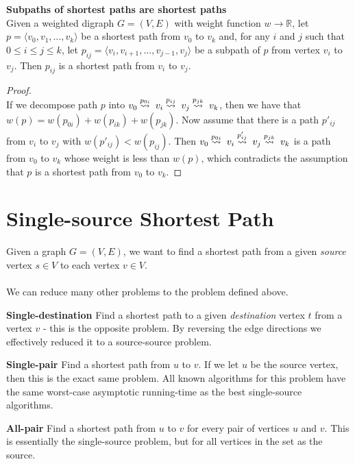 \begin{lemma}
\label{lemma:24.1}
	\textbf{Subpaths of shortest paths are shortest paths} \\
	Given a weighted digraph $G = (V, E)$ with weight function $w \rightarrow
	\mathbb{R}$, let $p = \langle v_0, v_1, \dots, v_k \rangle$ be a shortest
	path from $v_0$ to $v_k$ and, for any $i$ and $j$ such that $0 \leq i \leq
	j \leq k$, let $p_{ij} = \langle v_i, v_{i+1}, \dots, v_{j-1}, v_j
	\rangle$ be a subpath of $p$ from vertex $v_i$ to $v_j$. Then $p_{ij}$ is
	a shortest path from $v_i$ to $v_j$.
\end{lemma} 

\begin{proof} \textnormal{\cite[p.~645, thm.~24.1]{clrs}} \\
	If we decompose path $p$ into $v_0 \buildrel{p_{0i}}\over\leadsto\; v_i
	\buildrel{p_{ij}}\over\leadsto\; v_j \buildrel{p_{jk}}\over\leadsto\; v_k$,
	then we have that $w(p) = w(p_{0i}) + w(p_{ik}) + w(p_{jk})$. Now assume
	that there is a path $p'_{ij}$ from $v_i$ to $v_j$ with $w(p'_{ij}) <
	w(p_{ij})$. Then $v_0 \buildrel{p_{0i}}\over\leadsto\; v_i
	\buildrel{p'_{ij}}\over\leadsto\; v_j
	\buildrel{p_{jk}}\over\leadsto\; v_k$ is a path from $v_0$ to $v_k$ whose
	weight is less than $w(p)$, which contradicts the assumption that $p$ is
	a shortest path from $v_0$ to $v_k$.
\end{proof}

\section{Single-source Shortest Path}
Given a graph $G = (V, E)$, we want to find a shortest path from a given
\textit{source} vertex $s \in V$ to each vertex $v \in V$.
\\\\
\noindent We can reduce many other problems to the problem defined above.
\begin{description}
	\item \textbf{Single-destination} Find a shortest path to a given
\textit{destination} vertex $t$ from a vertex $v$ - this is the opposite
problem. By reversing the edge directions we effectively reduced it to a
source-source problem.
	\item \textbf{Single-pair} Find a shortest path from $u$ to $v$. If we let
$u$ be the source vertex, then this is the exact same problem. All known
algorithms for this problem have the same worst-case asymptotic running-time
as the best single-source algorithms. %
	\item \textbf{All-pair} Find a shortest path from $u$ to $v$ for every
pair of vertices $u$ and $v$. This is essentially the single-source problem,
but for all vertices in the set as the source.
\end{description}

